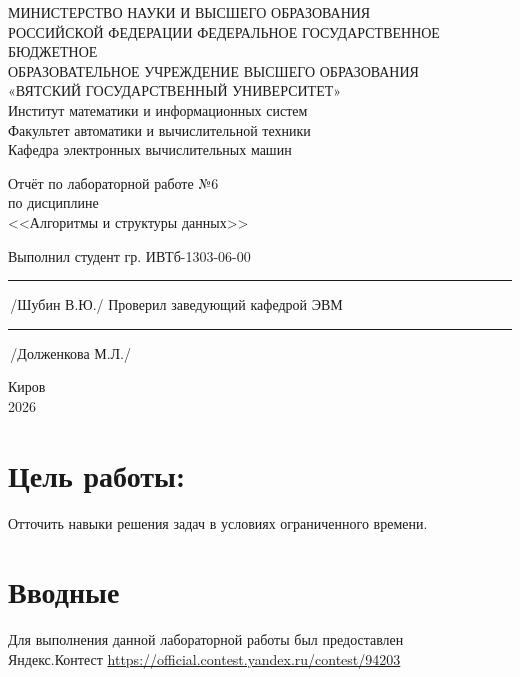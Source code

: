 \documentclass[oneside,a4paper,14pt]{extarticle} %
\begin{document}
	\newpage\thispagestyle{empty}
	\begin{center}
		МИНИСТЕРСТВО НАУКИ И ВЫСШЕГО ОБРАЗОВАНИЯ\\
		РОССИЙСКОЙ ФЕДЕРАЦИИ
		ФЕДЕРАЛЬНОЕ ГОСУДАРСТВЕННОЕ БЮДЖЕТНОЕ\\
		ОБРАЗОВАТЕЛЬНОЕ
		УЧРЕЖДЕНИЕ ВЫСШЕГО ОБРАЗОВАНИЯ\\
		«ВЯТСКИЙ ГОСУДАРСТВЕННЫЙ УНИВЕРСИТЕТ»\\
		Институт математики и информационных систем\\
		Факультет автоматики и вычислительной техники\\
		Кафедра электронных вычислительных машин
	\end{center}
	\vspace{20mm}
	
	\begin{center}
		Отчёт по лабораторной работе №6\\
		по дисциплине\\
		<<Алгоритмы и структуры данных>>\\
	\end{center}
	\vspace{48mm}
	
	\noindent
	Выполнил студент гр. ИВТб-1303-06-00 \hfill \rule[-0,5mm]{30mm}{0.15mm}\,/Шубин В.Ю./
	\newline
	Проверил заведующий кафедрой ЭВМ \hfill \rule[-0,5mm]{30mm}{0.15mm}\,/Долженкова М.Л./
	
	\vfill
	\begin{center}
		Киров\\
		2026
	\end{center}
	
	\newpage
	
	\section*{Цель работы:}
	Отточить навыки решения задач в условиях ограниченного времени.
	
	\section*{Вводные}
	Для выполнения данной лабораторной работы был предоставлен \\ Яндекс.Контест
	\url{https://official.contest.yandex.ru/contest/94203}
	
\end{document}
